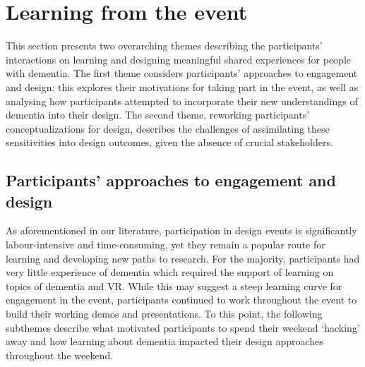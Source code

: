 \section{Learning from the event}
\label{sec:LearningEvent}
This section presents two overarching themes describing the participants' interactions on learning and designing meaningful shared experiences for people with dementia. The first theme considers participants' approaches to engagement and design: this explores their motivations for taking part in the event, as well as analysing how participants attempted to incorporate their new understandings of dementia into their design. The second theme, reworking participants’ conceptualizations for design, describes the challenges of assimilating these sensitivities into design outcomes, given the absence of crucial stakeholders.

\subsection{Participants' approaches to engagement and design}
\label{LearningEvent:ThemeOne}
As aforementioned in our literature, participation in design events is significantly labour-intensive and time-consuming, yet they remain a popular route for learning and developing new paths to research. For the majority, participants had very little experience of dementia which required the support of learning on topics of dementia and VR. While this may suggest a steep learning curve for engagement in the event, participants continued to work throughout the event to build their working demos and presentations. To this point, the following subthemes describe what motivated participants to spend their weekend ‘hacking’ away and how learning about dementia impacted their design approaches throughout the weekend.

